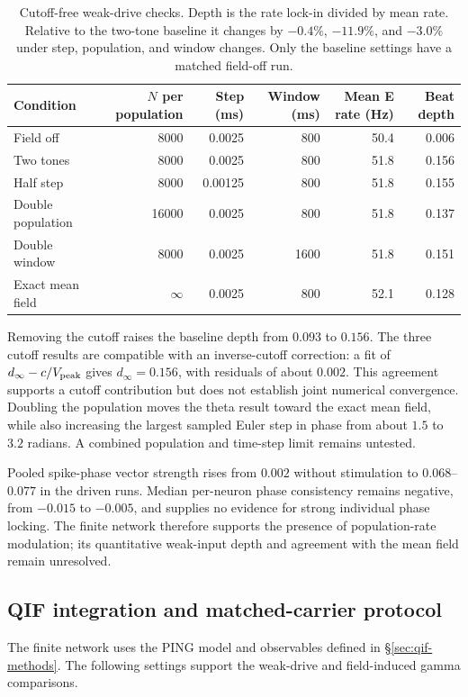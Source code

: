 \documentclass[11pt,a4paper]{article}
\newif\ifjne
\providecommand{\DIFaddtex}[1]{{\protect\color{blue} \sf #1}} %
\providecommand{\DIFaddbegin}{} %
\providecommand{\DIFadd}[1]{\texorpdfstring{\DIFaddtex{#1}}{#1}} %
\begin{document}
\begin{table}[htbp]
\centering\small
\begin{tabular}{@{}lrrrrr@{}}
\toprule
Condition & $N$ per population & Step (ms) & Window (ms) & Mean E rate (Hz) & Beat depth\\
\midrule
Field off & 8000 & 0.0025 & 800 & 50.4 & 0.006\\
Two tones & 8000 & 0.0025 & 800 & 51.8 & 0.156\\
Half step & 8000 & 0.00125 & 800 & 51.8 & 0.155\\
Double population & 16000 & 0.0025 & 800 & 51.8 & 0.137\\
Double window & 8000 & 0.0025 & 1600 & 51.8 & 0.151\\
Exact mean field & $\infty$ & 0.0025 & 800 & 52.1 & 0.128\\
\bottomrule
\end{tabular}
\caption{Cutoff-free weak-drive checks. Depth is the rate lock-in divided by
mean rate. Relative to the two-tone baseline it changes by $-0.4\%$,
$-11.9\%$, and $-3.0\%$ under step, population, and window changes.
Only the baseline settings have a matched field-off run.}
\label{tab:theta-pilot}
\end{table}

Removing the cutoff raises the baseline depth from $0.093$ to $0.156$.
The three cutoff results are compatible with an inverse-cutoff correction:
a fit of $d_\infty-c/V_{\rm peak}$ gives $d_\infty=0.156$, with residuals
of about $0.002$. This agreement supports a cutoff contribution but does not
establish joint numerical convergence. Doubling the population moves the
theta result toward the exact mean field, while also increasing the largest
sampled Euler step in phase from about $1.5$ to $3.2$ radians. A combined
population and time-step limit remains untested.

Pooled spike-phase vector strength rises from $0.002$ without stimulation
to $0.068$--$0.077$ in the driven runs. Median per-neuron phase consistency
remains negative, from $-0.015$ to $-0.005$, and supplies no evidence for
strong individual phase locking. The finite network therefore supports the
presence of population-rate modulation; its quantitative weak-input depth
and agreement with the mean field remain unresolved.

\fi

\DIFaddbegin \ifjne\else
\subsection{\DIFadd{QIF integration and matched-carrier protocol}}\label{supp:qif-protocol}
\DIFadd{The finite network uses the PING model and observables defined in
\S\ref{sec:qif-methods}. The following settings support the weak-drive and
field-induced gamma comparisons.
}
\end{document}
